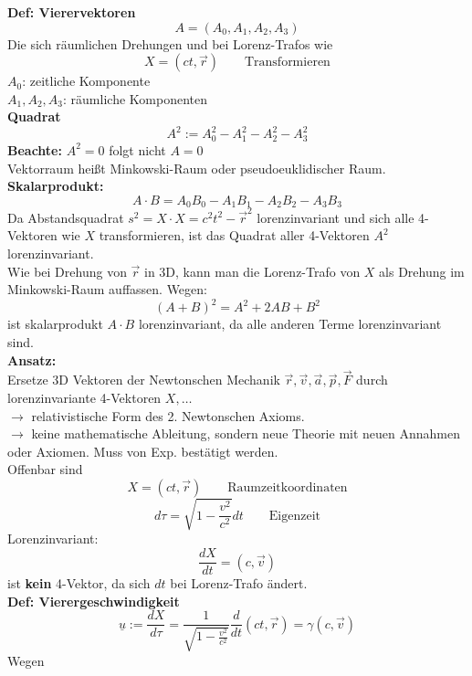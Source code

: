 \documentclass[titlepage,12pt,a4paper,ngerman]{report}
\newcommand{\tx}[1]{\textrm{#1}}
\begin{document}
{\begin{enumerate}[1)]
\end{enumerate}
\textbf{Def: Vierervektoren}
$$ A = (A_0,A_1,A_2,A_3)$$
Die sich räumlichen Drehungen und bei Lorenz-Trafos wie
$$X = (ct, \vec{r}) \qquad \tx{Transformieren}$$
$ A_0 $: zeitliche Komponente\\
$ A_1,A_2,A_3 $: räumliche Komponenten\\[5pt]
\textbf{Quadrat}
$$A^2 := A_0^2 - A_1^2 - A_2^2 - A_3^2$$
\textbf{Beachte:} $ A^2 = 0 $ folgt nicht $ A = 0 $\\[5pt]
Vektorraum heißt Minkowski-Raum oder pseudoeuklidischer Raum.\\[5pt]
\textbf{Skalarprodukt:}
$$A \cdot B = A_0 B_0 - A_1 B_1 - A_2 B_2 - A_3 B_3$$
Da Abstandsquadrat $ s^2 = X \cdot X = c^2 t^2 - \vec{r}^2 $ lorenzinvariant und sich alle 4-Vektoren wie $ X $ transformieren, ist das Quadrat aller 4-Vektoren $ A^2 $ lorenzinvariant.\\
Wie bei Drehung von $\vec{r}$ in 3D, kann man die Lorenz-Trafo von $ X $ als Drehung im Minkowski-Raum auffassen. Wegen:
$$(A+B)^2 = A^2 + 2AB + B^2$$
ist skalarprodukt $ A\cdot B $ lorenzinvariant, da alle anderen Terme lorenzinvariant sind.\\[5pt]
\textbf{Ansatz:}\\
Ersetze 3D Vektoren der Newtonschen Mechanik $ \vec{r},\vec{v},\vec{a},\vec{p},\vec{F} $ durch lorenzinvariante 4-Vektoren $ X, \dots $\\
$ \rightarrow $ relativistische Form des 2. Newtonschen Axioms.\\
$ \rightarrow $ keine mathematische Ableitung, sondern neue Theorie mit neuen Annahmen oder Axiomen. Muss von Exp. bestätigt werden.\\[5pt]
Offenbar sind
\begin{equation*}
X = (ct,\vec{r}) \qquad \tx{Raumzeitkoordinaten} \tag{1}
\end{equation*}
\begin{equation*}
d\tau = \sqrt{1 - \frac{v^2}{c^2}} dt \qquad \tx{Eigenzeit} \tag{2}
\end{equation*}
Lorenzinvariant:
$$\frac{dX}{dt} = (c,\vec{v})$$
ist \textbf{kein} 4-Vektor, da sich $ dt $ bei Lorenz-Trafo ändert.\\[5pt]
\textbf{Def: Vierergeschwindigkeit}
\begin{equation*}
\underline{u} := \frac{dX}{d\tau} = \frac{1}{\sqrt{1-\frac{v^2}{c^2}}} \frac{d}{dt} (ct,\vec{r})  = \gamma (c, \vec{v}) \tag{3}
\end{equation*}
Wegen
\begin{equation*}

\end{equation*}}
\end{document}
